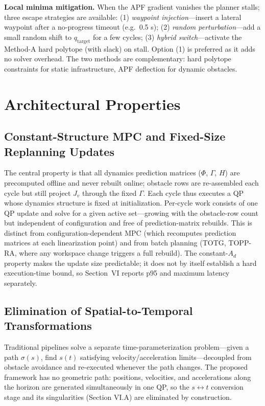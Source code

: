\textbf{Local minima mitigation.} When the APF gradient vanishes the
planner stalls; three escape strategies are available: (1) \emph{waypoint
injection}---insert a lateral waypoint after a no-progress timeout
(e.g.\ 0.5 s); (2) \emph{random perturbation}---add a small random shift to
\(q_\text{target}\) for a few cycles; (3) \emph{hybrid switch}---activate
the Method-A hard polytope (with slack) on stall. Option (1) is preferred
as it adds no solver overhead. The two methods are complementary: hard
polytope constraints for static infrastructure, APF deflection for dynamic
obstacles.

\section{Architectural Properties}\label{v.-architectural-properties}

\subsection{Constant-Structure MPC and Fixed-Size Replanning
Updates}\label{a.-constant-structure-mpc-and-bounded-replanning-latency}

The central property is that all dynamics prediction matrices (\(\Phi\),
\(\Gamma\), \(H\)) are precomputed offline and never rebuilt online;
obstacle rows are re-assembled each cycle but still project \(J_v\) through
the fixed \(\Gamma\). Each cycle thus executes a QP whose dynamics structure
is fixed at initialization. Per-cycle work consists of one QP update and
solve for a given active set---growing with the obstacle-row count but
independent of configuration and free of prediction-matrix rebuilds. This is distinct
from configuration-dependent MPC (which recomputes prediction matrices at
each linearization point) and from batch planning (TOTG, TOPP-RA, where any
workspace change triggers a full rebuild). The constant-\(A_d\) property makes
the update size predictable; it does not by itself establish a hard execution-time
bound, so Section~VI reports p95 and maximum latency separately.

\subsection{Elimination of Spatial-to-Temporal
Transformations}\label{b.-elimination-of-spatial-to-temporal-transformations}

Traditional pipelines solve a separate time-parameterization problem---given
a path \(\sigma(s)\), find \(s(t)\) satisfying velocity/acceleration
limits---decoupled from obstacle avoidance and re-executed whenever the path
changes. The proposed framework has no geometric path: positions,
velocities, and accelerations along the horizon are generated simultaneously
in one QP, so the \(s \leftrightarrow t\) conversion stage and its
singularities (Section VI.A) are eliminated by construction.

